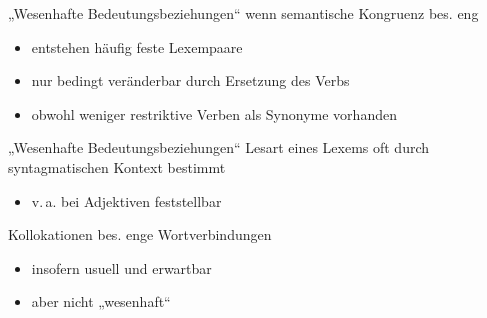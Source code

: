 \begin{frame}{„Wesenhafte Bedeutungsbeziehungen“}
\onslide<+->
wenn semantische Kongruenz bes. eng
\begin{itemize}[<+->]
	\item		entstehen häufig feste Lexempaare
	\item		nur bedingt veränderbar durch Ersetzung des Verbs
	\item		obwohl weniger restriktive Verben als Synonyme vorhanden
\end{itemize}
\onslide<+->
\Zeile
\begin{exe}
	\ex\label{ex:wesenhafte.bedeutungsbeziehungen-006}
    \begin{xlist}
		\onslide<+->
		\onslide<+->
		\onslide<+->
	\end{xlist}
\end{exe}
\end{frame}

\begin{frame}{„Wesenhafte Bedeutungsbeziehungen“}
\onslide<+->
Lesart eines Lexems oft durch syntagmatischen Kontext bestimmt
\begin{itemize}[<+->]
	\item		v.\,a. bei Adjektiven feststellbar
\end{itemize}
\onslide<+->
\Zeile
\begin{exe}
	\onslide<+->
\end{exe}
\end{frame}

\begin{frame}{Kollokationen}
\onslide<+->
bes. enge Wortverbindungen
\begin{itemize}[<+->]
	\item		insofern usuell und erwartbar
	\item		aber nicht „wesenhaft“
\end{itemize}
\onslide<+->
\Zeile
\begin{exe}
	\ex\label{ex:kollokationen-001}
    \begin{xlist}
		\onslide<+->
		\onslide<+->
	\end{xlist}
\end{exe}
\end{frame}

